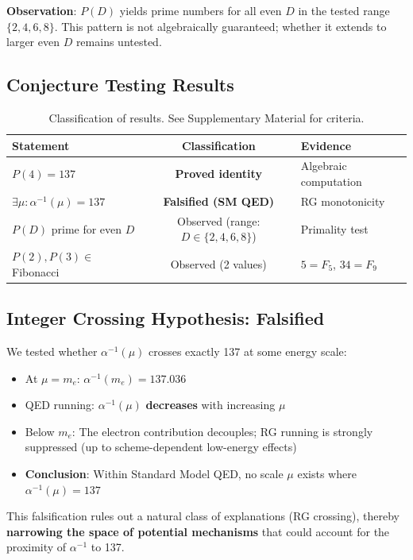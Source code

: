 \documentclass[11pt,a4paper]{article}
\begin{document}
\textbf{Observation}: $P(D)$ yields prime numbers for all even $D$ in the tested range $\{2, 4, 6, 8\}$. This pattern is not algebraically guaranteed; whether it extends to larger even $D$ remains untested.

\subsection{Conjecture Testing Results}

\begin{table}[h]
\centering
\begin{tabular}{|l|c|l|}
\hline
Statement & Classification & Evidence \\
\hline
$P(4) = 137$ & \textbf{Proved identity} & Algebraic computation \\
$\exists \mu: \alpha^{-1}(\mu) = 137$ & \textbf{Falsified (SM QED)} & RG monotonicity \\
$P(D)$ prime for even $D$ & Observed (range: $D \in \{2,4,6,8\}$) & Primality test \\
$P(2), P(3) \in$ Fibonacci & Observed (2 values) & $5 = F_5$, $34 = F_9$ \\
\hline
\end{tabular}
\caption{Classification of results. See Supplementary Material for criteria.}
\end{table}

\subsection{Integer Crossing Hypothesis: Falsified}

We tested whether $\alpha^{-1}(\mu)$ crosses exactly 137 at some energy scale:

\begin{itemize}
    \item At $\mu = m_e$: $\alpha^{-1}(m_e) = 137.036$
    \item QED running: $\alpha^{-1}(\mu)$ \textbf{decreases} with increasing $\mu$
    \item Below $m_e$: The electron contribution decouples; RG running is strongly suppressed (up to scheme-dependent low-energy effects)
    \item \textbf{Conclusion}: Within Standard Model QED, no scale $\mu$ exists where $\alpha^{-1}(\mu) = 137$
\end{itemize}

This falsification rules out a natural class of explanations (RG crossing), thereby \textbf{narrowing the space of potential mechanisms} that could account for the proximity of $\alpha^{-1}$ to 137.
\end{document}

